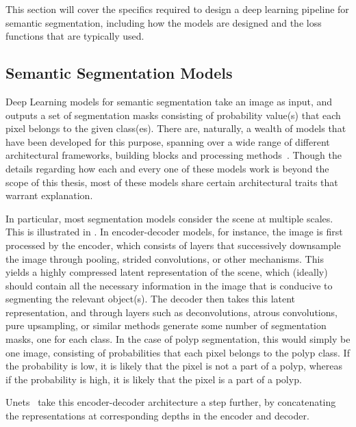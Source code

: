     This section will cover the specifics required to design a deep learning pipeline for semantic segmentation, including how the models are designed and the loss functions that are typically used. 
    
    \subsection{Semantic Segmentation Models}
    Deep Learning models for semantic segmentation take an image as input, and outputs a set of segmentation masks consisting of probability value(s) that each pixel belongs to the given class(es). There are, naturally, a wealth of models that have been developed for this purpose, spanning over a wide range of different architectural frameworks, building blocks and processing methods~\cite{semantic_segmentation_survey, segmentation_survey}. Though the details regarding how each and every one of these models work is beyond the scope of this thesis, most of these models share certain architectural traits that warrant explanation. 
    
    In particular, most segmentation models consider the scene at multiple scales. This is illustrated in . In encoder-decoder models, for instance, the image is first processed by the encoder, which consists of layers that successively downsample the image through pooling, strided convolutions, or other mechanisms. This yields a highly compressed latent representation of the scene, which (ideally) should contain all the necessary information in the image that is conducive to segmenting the relevant object(s). The decoder then takes this latent representation, and through layers such as deconvolutions, atrous convolutions, pure upsampling, or similar methods generate some number of segmentation masks, one for each class. In the case of polyp segmentation, this would simply be one image, consisting of probabilities that each pixel belongs to the polyp class. If the probability is low, it is likely that the pixel is not a part of a polyp, whereas if the probability is high, it is likely that the pixel is a part of a polyp. 

    Unets~\cite{unet} take this encoder-decoder architecture a step further, by concatenating the representations at corresponding depths in the encoder and decoder. 
    
